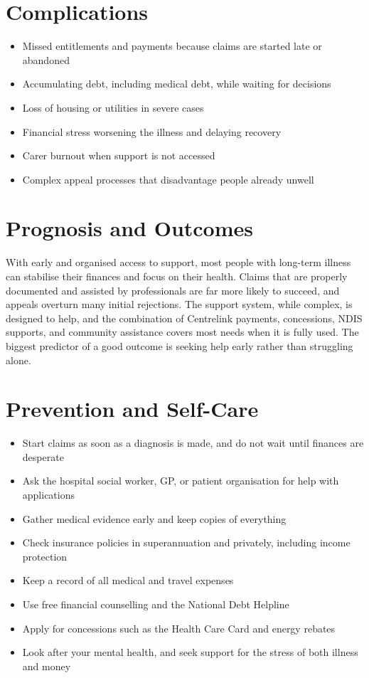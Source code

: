 \section*{Complications}
\begin{itemize}
    \item Missed entitlements and payments because claims are started late or abandoned
    \item Accumulating debt, including medical debt, while waiting for decisions
    \item Loss of housing or utilities in severe cases
    \item Financial stress worsening the illness and delaying recovery
    \item Carer burnout when support is not accessed
    \item Complex appeal processes that disadvantage people already unwell
\end{itemize}

\section*{Prognosis and Outcomes}
With early and organised access to support, most people with long-term illness can stabilise their finances and focus on their health. Claims that are properly documented and assisted by professionals are far more likely to succeed, and appeals overturn many initial rejections. The support system, while complex, is designed to help, and the combination of Centrelink payments, concessions, NDIS supports, and community assistance covers most needs when it is fully used. The biggest predictor of a good outcome is seeking help early rather than struggling alone.

\section*{Prevention and Self-Care}
\begin{itemize}
    \item Start claims as soon as a diagnosis is made, and do not wait until finances are desperate
    \item Ask the hospital social worker, GP, or patient organisation for help with applications
    \item Gather medical evidence early and keep copies of everything
    \item Check insurance policies in superannuation and privately, including income protection
    \item Keep a record of all medical and travel expenses
    \item Use free financial counselling and the National Debt Helpline
    \item Apply for concessions such as the Health Care Card and energy rebates
    \item Look after your mental health, and seek support for the stress of both illness and money
\end{itemize}

